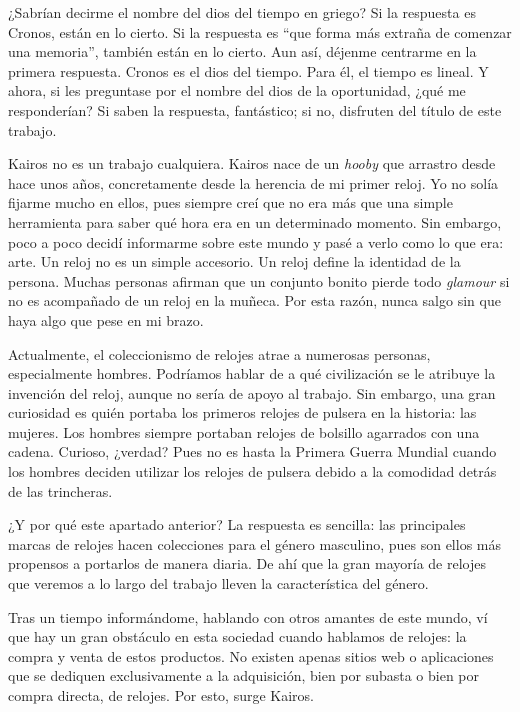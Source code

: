 
¿Sabrían decirme el nombre del dios del tiempo en griego? Si la respuesta es Cronos, están en lo cierto. Si la respuesta es ``que forma más extraña de comenzar una memoria'', también están en lo cierto. Aun así, déjenme centrarme en la primera respuesta. Cronos es el dios del tiempo. Para él, el tiempo es lineal. Y ahora, si les preguntase por el nombre del dios de la oportunidad, ¿qué me responderían? Si saben la respuesta, fantástico; si no, disfruten del título de este trabajo.

Kairos no es un trabajo cualquiera. Kairos nace de un \emph{hooby} que arrastro desde hace unos años, concretamente desde la herencia de mi primer reloj. Yo no solía fijarme mucho en ellos, pues siempre creí que no era más que una simple herramienta para saber qué hora era en un determinado momento. Sin embargo, poco a poco decidí informarme sobre este mundo y pasé a verlo como lo que era: arte. Un reloj no es un simple accesorio. Un reloj define la identidad de la persona. Muchas personas afirman que un conjunto bonito pierde todo \emph{glamour} si no es acompañado de un reloj en la muñeca. Por esta razón, nunca salgo sin que haya algo que pese en mi brazo.

Actualmente, el coleccionismo de relojes atrae a numerosas personas, especialmente hombres. Podríamos hablar de a qué civilización se le atribuye la invención del reloj, aunque no sería de apoyo al trabajo. Sin embargo, una gran curiosidad es quién portaba los primeros relojes de pulsera en la historia: las mujeres. Los hombres siempre portaban relojes de bolsillo agarrados con una cadena. Curioso, ¿verdad? Pues no es hasta la Primera Guerra Mundial cuando los hombres deciden utilizar los relojes de pulsera debido a la comodidad detrás de las trincheras.

¿Y por qué este apartado anterior? La respuesta es sencilla: las principales marcas de relojes hacen colecciones para el género masculino, pues son ellos más propensos a portarlos de manera diaria. De ahí que la gran mayoría de relojes que veremos a lo largo del trabajo lleven la característica del género.

Tras un tiempo informándome, hablando con otros amantes de este mundo, ví que hay un gran obstáculo en esta sociedad cuando hablamos de relojes: la compra y venta de estos productos. No existen apenas sitios web o aplicaciones que se dediquen exclusivamente a la adquisición, bien por subasta o bien por compra directa, de relojes. Por esto, surge Kairos.

